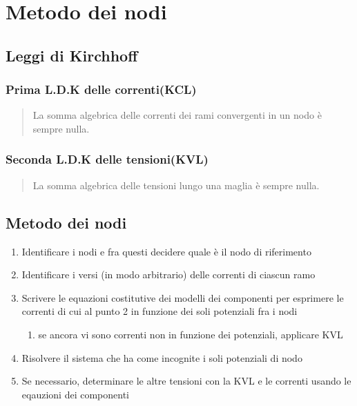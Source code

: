 \section{Metodo dei nodi}

\subsection{Leggi di Kirchhoff}
\subsubsection{Prima L.D.K delle correnti(KCL)}
\begin{quote}
    La somma algebrica delle correnti dei rami convergenti in un nodo è sempre nulla.
\end{quote}


\subsubsection{Seconda L.D.K delle tensioni(KVL)}
\begin{quote}
    La somma algebrica delle tensioni lungo una maglia è sempre nulla.
\end{quote}

\subsection{Metodo dei nodi}

\begin{enumerate}
    \item Identificare i nodi e fra questi decidere quale è il nodo di riferimento
    \item Identificare i versi (in modo arbitrario) delle correnti di ciascun ramo
    \item Scrivere le equazioni costitutive dei modelli dei componenti per esprimere le correnti di cui al punto 2 in funzione dei soli potenziali fra i nodi
        \begin{enumerate}
            \item se ancora vi sono correnti non in funzione dei potenziali, applicare KVL
        \end{enumerate}

    \item Risolvere il sistema che ha come incognite i soli potenziali di nodo
    \item Se necessario, determinare le altre tensioni con la KVL e le correnti usando le eqauzioni dei componenti
\end{enumerate}


